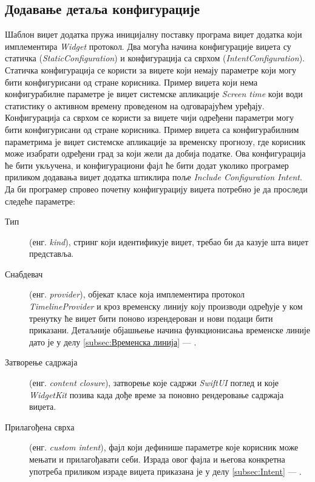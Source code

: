 \documentclass[12pt,oneside]{memoir}
\begin{document}
\subsection{Додавање детаља конфигурације}
\indent Шаблон виџет додатка пружа иницијалну поставку програма виџет додатка који имплементира \textit{Widget} протокол. Два могућа начина конфигурације виџета су статичка (\textit{StaticConfiguration}) и конфигурација са сврхом (\textit{IntentConfiguration}). \\
\indent Статичка конфигурација се користи за виџете који немају параметре који могу бити конфигурисани од стране корисника. Пример виџета који нема конфигурабилне параметре је виџет системске апликације \textit{Screen time} који води статистику о активном времену проведеном на одговарајућем уређају. Конфигурација са сврхом се користи за виџете чији одређени параметри могу бити конфигурисани од стране корисника. Пример виџета са конфигурабилним параметрима је виџет системске апликације за временску прогнозу, где корисник може изабрати одређени град за који жели да добија податке. Ова конфигурација ће бити укључена, и конфигурациони фајл ће бити додат уколико програмер приликом додавања виџет додатка штиклира поље \textit{Include Configuration Intent}.
\\
\indent Да би програмер спровео почетну конфигурацију виџета потребно је да проследи следеће параметре:
\begin{description}
    \item [Тип] (енг. \textit{kind}), стринг који идентификује виџет, требао би да казује шта виџет представља.
    \item [Снабдевач] (енг. \textit{provider}), објекат класе која имплементира протокол \textit{Time\-lineProvider} и кроз временску линију коју производи одређује у ком тренутку ће виџет бити поново изрендерован и нови подаци бити приказани. Детаљније објашњење начина функционисања временске линије дато је у делу \ref{subsec:Временска линија} --- .
    \item [Затворење садржаја] (енг. \textit{content closure}), затворење које садржи \textit{SwiftUI} поглед и које \textit{WidgetKit} позива када дође време за поновно рендеровање садржаја виџета.
    \item [Прилагођена сврха] (енг. \textit{custom intent}), фајл који дефинише параметре које корисник може мењати и прилагођавати себи. Израда овог фајла и његова конкретна употреба приликом израде виџета приказана је у делу \ref{subsec:Intent} --- .
\end{description}
\end{document}
